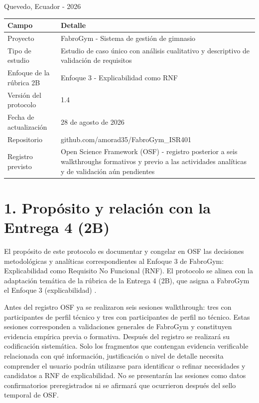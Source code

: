 \documentclass[9pt,a4paper]{extarticle}
\begin{document}
\vfill
\begin{center}
Quevedo, Ecuador - 2026
\end{center}
\clearpage

\tableofcontents
\clearpage

\begin{longtable}{@{}p{}p{}@{}}
\toprule
\textbf{Campo} & \textbf{Detalle} \\
\midrule
\endhead
Proyecto & FabroGym - Sistema de gestión de gimnasio \\
Tipo de estudio & Estudio de caso único con análisis cualitativo y descriptivo de validación de requisitos \\
Enfoque de la rúbrica 2B & Enfoque 3 - Explicabilidad como RNF \\
Versión del protocolo & 1.4 \\
Fecha de actualización & 28 de agosto de 2026 \\
Repositorio & github.com/amorad35/FabroGym\_ISR401 \\
Registro previsto & Open Science Framework (OSF) - registro posterior a seis walkthroughs formativos y previo a las actividades analíticas y de validación aún pendientes \\
\bottomrule
\end{longtable}

\section*{1. Propósito y relación con la Entrega 4 (2B)}

El propósito de este protocolo es documentar y congelar en OSF las decisiones metodológicas y analíticas correspondientes al Enfoque 3 de FabroGym: Explicabilidad como Requisito No Funcional (RNF). El protocolo se alinea con la adaptación temática de la rúbrica de la Entrega 4 (2B), que asigna a FabroGym el Enfoque 3 (explicabilidad) \cite{uteq2026}.

Antes del registro OSF ya se realizaron seis sesiones walkthrough: tres con participantes de perfil técnico y tres con participantes de perfil no técnico. Estas sesiones corresponden a validaciones generales de FabroGym y constituyen evidencia empírica previa o formativa. Después del registro se realizará su codificación sistemática. Solo los fragmentos que contengan evidencia verificable relacionada con qué información, justificación o nivel de detalle necesita comprender el usuario podrán utilizarse para identificar o refinar necesidades y candidatos a RNF de explicabilidad. No se presentarán las sesiones como datos confirmatorios preregistrados ni se afirmará que ocurrieron después del sello temporal de OSF.
\end{document}
